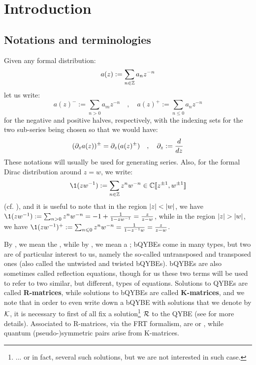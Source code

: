 \section{Introduction}
    \subsection{Notations and terminologies}
        Given any formal distribution:
            $$a(z) := \sum_{n \in \mathbb{Z}} a_n z^{-n}$$
        let us write:
            $$a(z)^- := \sum_{n > 0} a_m z^{-n} \quad, \quad a(z)^+ := \sum_{n \leq 0} a_n z^{-n}$$
        for the negative and positive halves, respectively, with the indexing sets for the two sub-series being chosen so that we would have:
            $$(\partial_z a(z))^{\pm} = \partial_z( a(z)^{\pm} ) \quad, \quad \partial_z := \frac{d}{dz}$$
        These notations will usually be used for generating series. Also, for the formal Dirac distribution around $z = w$, we write:
            $$\1(zw^{-1}) := \sum_{n \in \Z} z^n w^{-n} \in \bbC[\![z^{\pm 1}, w^{\pm 1}]\!]$$
        (cf. \cite[p. 65]{jimbo_miwa_algebraic_analysis_of_solvable_lattice_models}), and it is useful to note that in the region $\left\lvert {z} \right\rvert < \left\lvert {w} \right\rvert$, we have $\1(zw^{-1}) := \sum_{n > 0} z^n w^{-n} = -1 + \frac{1}{1 - zw^{-1}} = \frac{z}{z - w}$, while in the region $\left\lvert {z} \right\rvert > \left\lvert {w} \right\rvert$, we have $\1(zw^{-1})^+ := \sum_{n \leq 0} z^n w^{-n} = \frac{1}{1 - z^{-1}w} = \frac{z}{z - w}$.

        By , we mean the , while by , we mean a ; bQYBEs come in many types, but two are of particular interest to us, namely the so-called untransposed and transposed ones (also called the untwisted and twisted bQYBEs). bQYBEs are also sometimes called reflection equations, though for us these two terms will be used to refer to two similar, but different, types of equations. Solutions to QYBEs are called \textbf{R-matrices}, while solutions to bQYBEs are called \textbf{K-matrices}, and we note that in order to even write down a bQYBE with solutions that we denote by $\mathcal{K}$, it is necessary to first of all fix a solution\footnote{... or in fact, several such solutions, but we are not interested in such case.} $\mathcal{R}$ to the QYBE (see \cite[Section 6]{regelskis_vlaar_reflection_matrices_coideal_subalgebras} for more details). Associated to R-matrices, via the FRT formalism, are  or , while quantum (pseudo-)symmetric pairs arise from K-matrices.

